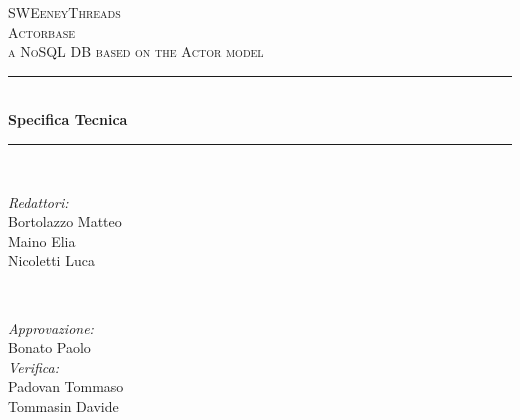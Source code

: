 \documentclass[a4paper]{article}
\begin{document}
	
	\begin{titlepage}
		\newcommand{\HRule}{\rule{\linewidth}{0.5mm}} 
		\center  
		
		\textsc{\LARGE SWEeneyThreads}\\[1.5cm] 
		\textsc{\Large Actorbase}\\[0.5cm] 
		\textsc{\large a NoSQL DB based on the Actor model}\\[0.5cm]
		
		
		\HRule \\[0.4cm]
		{ \huge \bfseries Specifica Tecnica}\\[0.4cm] 
		\HRule \\[1.5cm]
		
		\begin{minipage}{0.4\textwidth}
			\begin{flushleft} \large
				\emph{Redattori:}\\
				Bortolazzo Matteo \\
				Maino Elia \\
				Nicoletti Luca  \\
			\end{flushleft}
		\end{minipage}
		~
		\begin{minipage}{0.4\textwidth}
			\begin{flushright} \large
				\emph{Approvazione:} \\
                    Bonato Paolo\\
				\emph{Verifica:} \\
                    Padovan Tommaso\\
                    Tommasin Davide \\
				 
			\end{flushright}
		\end{minipage}
		

\end{titlepage}
\end{document}
